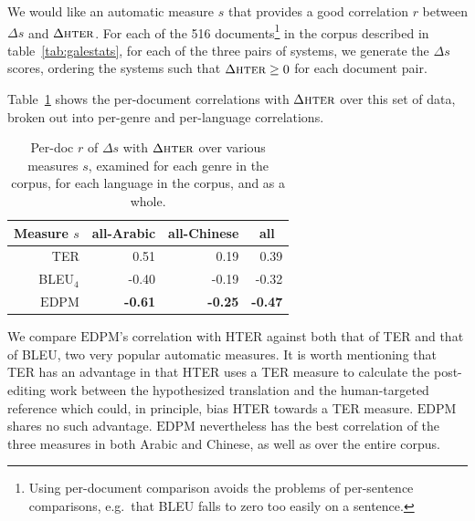 \documentclass[11pt]{article}
\newcommand{\myEDPM}[0]{\ensuremath{\mathrm{EDPM}}}
\begin{document}
We would like an automatic measure $s$ that provides a good
correlation $r$ between $\Delta s$ and $\Delta \textsc{hter}$.  For
each of the 516 documents\footnote{Using per-document comparison
  avoids the problems of per-sentence comparisons, e.g.\ that BLEU
  falls to zero too easily on a sentence.} in the corpus described in
table~\ref{tab:galestats}, for each of the three pairs of systems, we
generate the $\Delta s$ scores, ordering the systems such that
$\Delta\textsc{hter} \geq 0$ for each document pair.


Table~\ref{tab:hter:perdoc1} shows the per-document correlations with
$\Delta\textsc{hter}$ over this set of data, broken out into per-genre
and per-language correlations.

\begin{table}
  \centering
  \begin{tabular}{r|r|r||r}
     \multicolumn{1}{c|}{Measure $s$} 
     & \multicolumn{1}{c|}{all-Arabic} &
     \multicolumn{1}{c||}{all-Chinese} &\multicolumn{1}{c}{all}\\
    \hline{}
    TER      &  0.51 &  0.19 &  0.39 \\
    BLEU$_4$ & -0.40 & -0.19 & -0.32 \\
    \myEDPM  & 
       \textbf{-0.61}&
               \textbf{-0.25}&
                       \textbf{-0.47}\\
  \end{tabular}
  \caption{Per-doc $r$ of $\Delta s$ with $\Delta\textsc{hter}$ over
    various measures $s$, examined for each genre in the corpus, for each
    language in the corpus, and as a whole. }
  \label{tab:hter:perdoc1}
\end{table}
We compare \myEDPM{}'s correlation with HTER against both that of TER
and that of BLEU, two very popular automatic measures. It is worth
mentioning that TER has an 
advantage in that HTER uses a TER
measure to calculate the post-editing work between the hypothesized
translation and the human-targeted reference which could, in
principle, bias HTER towards a TER measure. \myEDPM{} shares no such
advantage.  \myEDPM{} nevertheless has the best
correlation of the three measures in both Arabic and
Chinese, as well as over the entire corpus.
\end{document}
